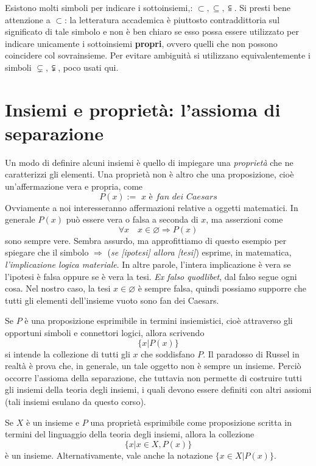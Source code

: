 \begin{osservaz}
Esistono molti simboli per indicare i
sottoinsiemi,: $\subset,\subseteq,\subseteqq$.
Si presti bene attenzione a $\subset$: la letteratura
accademica è piuttosto contraddittoria sul significato di tale
simbolo e non è ben chiaro se esso possa essere utilizzato per
indicare unicamente i sottoinsiemi \textbf{propri}, ovvero quelli
che non possono coincidere col sovrainsieme. Per evitare
ambiguità si utilizzano equivalentemente i simboli $\subsetneq,\subsetneqq$, poco usati
qui.
\end{osservaz}

\section{Insiemi e proprietà: l'assioma di separazione}
Un modo di definire alcuni insiemi è quello di impiegare una \textit{proprietà}
che ne caratterizzi gli elementi. Una proprietà non è altro che una proposizione,
cioè un'affermazione vera e propria, come
\[ P(x) := \textit{ x è fan dei Caesars} \]
Ovviamente a noi interesseranno affermazioni relative a oggetti matematici.
In generale $P(x)$ può essere vera o falsa a seconda di $x$, ma asserzioni come
\[ \forall x \quad x\in\varnothing\Longrightarrow P(x) \]
sono sempre vere. Sembra assurdo, ma approfittiamo di questo esempio per
spiegare che il simbolo $\Longrightarrow$ (\textit{se [ipotesi] allora [tesi]}) esprime, in matematica, \textit{l'implicazione logica materiale}.
In altre parole, l'intera implicazione è vera se l'ipotesi è falsa oppure se
è vera la tesi. \textit{Ex falso quodlibet}, dal falso segue ogni cosa. Nel
nostro caso, la tesi $x\in\varnothing$ è sempre falsa, quindi possiamo
supporre che tutti gli elementi dell'insieme vuoto sono fan dei Caesars.


Se $P$ è una proposizione esprimibile
in termini insiemistici, cioè attraverso gli opportuni simboli e connettori
logici, allora scrivendo
\[\{x|P(x)\}\]
si intende la collezione di tutti gli $x$ che soddisfano $P$. Il paradosso
di Russel in realtà è prova che, in generale, un tale oggetto non è
sempre un insieme. Perciò occorre l'assioma della separazione, che tuttavia
non permette di costruire tutti gli insiemi della teoria degli insiemi, i
quali devono essere definiti con altri assiomi
(tali insiemi esulano da questo corso).

\begin{tcolorbox}[colback=yellow!30, colframe=yellow!30!black, title={Assioma della separazione}]
Se $X$ è un insieme e $P$ una proprietà esprimibile come proposizione
scritta in termini del linguaggio della teoria degli insiemi, allora
la collezione
\[ \{x|x\in X, P(x)\} \]
è un insieme. Alternativamente, vale anche la notazione $\{x\in X|P(x)\}$.
\end{tcolorbox}

